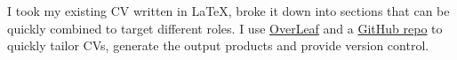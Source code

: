 \descript{ }
I took my existing CV written in \LaTeX, broke it down into sections that can be quickly combined to target different roles.
I use \href{https://www.overleaf.com}{OverLeaf} and a \href{https://www.github.com/laywill/CV}{GitHub repo} to quickly tailor CVs, generate the output products and provide version control.
\sectionsep{}
